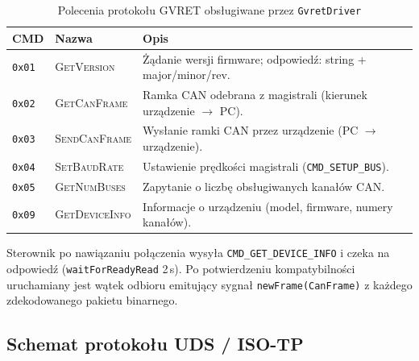 \documentclass[12pt, a4paper]{article}
\begin{document}
\begin{table}[H]
\caption{Polecenia protokołu GVRET obsługiwane przez \texttt{GvretDriver}}
\label{tab:gvret}
\centering
\small
\begin{tabular}{p{1.8cm}p{3.0cm}p{9.0cm}}
\toprule
\textbf{CMD} & \textbf{Nazwa} & \textbf{Opis} \\
\midrule
\texttt{0x01} & \textsc{GetVersion}   & Żądanie wersji firmware; odpowiedź: string + major/minor/rev. \\
\texttt{0x02} & \textsc{GetCanFrame}  & Ramka CAN odebrana z magistrali (kierunek urządzenie $\to$ PC). \\
\texttt{0x03} & \textsc{SendCanFrame} & Wysłanie ramki CAN przez urządzenie (PC $\to$ urządzenie). \\
\texttt{0x04} & \textsc{SetBaudRate}  & Ustawienie prędkości magistrali (\texttt{CMD\_SETUP\_BUS}). \\
\texttt{0x05} & \textsc{GetNumBuses}  & Zapytanie o liczbę obsługiwanych kanałów CAN. \\
\texttt{0x09} & \textsc{GetDeviceInfo}& Informacje o urządzeniu (model, firmware, numery kanałów). \\
\bottomrule
\end{tabular}
\end{table}

Sterownik po nawiązaniu połączenia wysyła \texttt{CMD\_GET\_DEVICE\_INFO} i czeka
na odpowiedź (\texttt{waitForReadyRead} 2\,s). Po potwierdzeniu kompatybilności
uruchamiany jest wątek odbioru emitujący sygnał \texttt{newFrame(CanFrame)}
z każdego zdekodowanego pakietu binarnego.

\subsection{Schemat protokołu UDS / ISO-TP}
\end{document}
